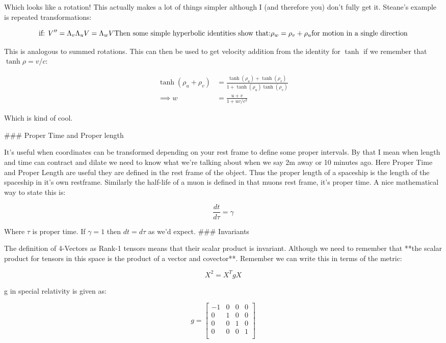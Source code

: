 Which looks like a rotation! This actually makes a lot of things simpler although I (and therefore you) don't fully get it. Steane's example is repeated transformations:

$$
\text{if: } V^{\prime\prime} = \Lambda_v\Lambda_uV = \Lambda_wV\\
\text{Then some simple hyperbolic identities show that:}\\
\rho_w = \rho_v + \rho_u\\
\text{for motion in a single direction}
$$

This is analogous to summed rotations. This can then be used to get velocity addition from the identity for $\tanh$ if we remember that $\tanh\rho = v/c$:

$$
\begin{aligned}
\tanh(\rho_u + \rho_v) &= \frac{\tanh(\rho_u) + \tanh(\rho_v)}{1 + \tanh(\rho_u)\tanh(\rho_v)}\\
\implies w &= \frac{u+v}{1 + uv/c^2}
\end{aligned}
$$

Which is kind of  cool.

### Proper Time and Proper length

It's useful when coordinates can be transformed depending on your rest frame to define some proper intervals. By that I mean when length and time can contract and dilate we need to know what we're talking about when we say 2m away or 10 minutes ago. Here Proper Time and Proper Length are useful they are defined in the rest frame of the object. Thus the proper length of a spaceship is the length of the spaceship in it's own restframe. Similarly the half-life of a muon is defined in that muons rest frame, it's proper time. A nice mathematical way to state this is:

$$
\frac{dt}{d\tau} = \gamma
$$

Where $\tau$ is proper time. If $\gamma=1$ then $dt=d\tau$ as we'd expect.
### Invariants

The definition of 4-Vectors as Rank-1 tensors means that their scalar product is invariant. Although we need to remember that **the scalar product for tensors in this space is the product of a vector and covector**. Remember we can write this in terms of the metric:

$$
X^2 = X^TgX
$$

g in special relativity is given as:

$$
g=
\begin{bmatrix}
    -1 & 0 & 0 & 0\\
    0  & 1 & 0 & 0\\    
    0  & 0 & 1 & 0\\
    0  & 0 & 0 & 1\\
\end{bmatrix}
$$

